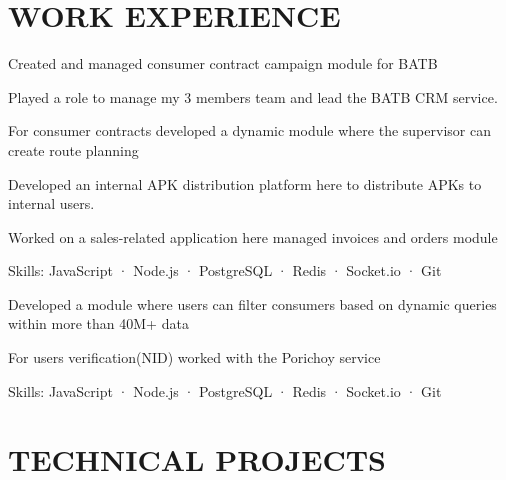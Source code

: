 \documentclass[]{deedy-resume-openfont}
\begin{document}
\hfill
\begin{minipage}[t]{0.65\textwidth} 

\section{WORK EXPERIENCE}
\vspace{\topsep}
\begin{tightemize}
\item Created and managed consumer contract campaign module for BATB
\item Played a role to manage my 3 members team and lead the BATB CRM service.
\item For consumer contracts developed a dynamic module where the supervisor can create route planning
\item Developed an internal APK distribution platform here to distribute APKs to internal users.
\item Worked on a sales-related application here managed invoices and orders module
\item Skills: JavaScript · Node.js · PostgreSQL · Redis · Socket.io · Git
\end{tightemize}
\sectionsep

\vspace{\topsep}
\begin{tightemize}
\item Developed a module where users can filter consumers based on dynamic queries within more than 40M+ data
\item For users verification(NID) worked with the Porichoy service
\item Skills: JavaScript · Node.js · PostgreSQL · Redis · Socket.io · Git
\end{tightemize}
\sectionsep


\section{TECHNICAL PROJECTS}


\end{minipage}
\end{document}
